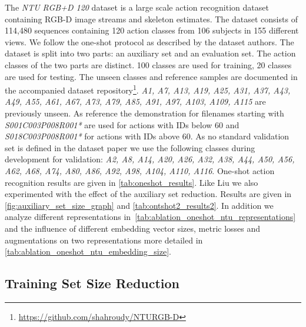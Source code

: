 The \textit{NTU RGB+D 120} \cite{liu2019ntu} dataset is a large scale action recognition dataset containing RGB-D image streams and skeleton estimates. 
The dataset consists of 114,480 sequences containing 120 action classes from 106 subjects in 155 different views.
We follow the one-shot protocol as described by the dataset authors. The dataset is split into two parts: an auxiliary set and an evaluation set. The action classes of the two parts are distinct. 100 classes are used for training, 20 classes are used for testing. The unseen classes and reference samples are documented in the accompanied dataset repository\footnote{\url{https://github.com/shahroudy/NTURGB-D}}. \textit{A1, A7, A13, A19, A25, A31, A37, A43, A49, A55, A61, A67, A73, A79, A85, A91, A97, A103, A109, A115} are previously unseen. As reference the demonstration for filenames starting with \textit{S001C003P008R001*} are used for actions with IDs below 60 and \textit{S018C003P008R001*} for actions with IDs above 60.
As no standard validation set is defined in the dataset paper we use the following classes during development for validation: \textit{A2, A8, A14, A20, A26, A32, A38, A44, A50, A56, A62, A68, A74, A80, A86, A92, A98, A104, A110, A116}.
One-shot action recognition results are given in \tabname \ref{tab:oneshot_results}. Like Liu \andothers \cite{liu2019ntu} we also experimented with the effect of the auxiliary set reduction. Results are given in \figname \ref{fig:auxiliary_set_size_graph} and \tabname \ref{tab:ontshot2_results2}. 
In addition we analyze different representations in \tabname\,\ref{tab:ablation_oneshot_ntu_representations} and the influence of different embedding vector sizes, metric losses and augmentations on two representations more detailed in \tabname\,\ref{tab:ablation_oneshot_ntu_embedding_size}.








\subsection{Training Set Size Reduction}
\label{ssec:training_set_reduction}

